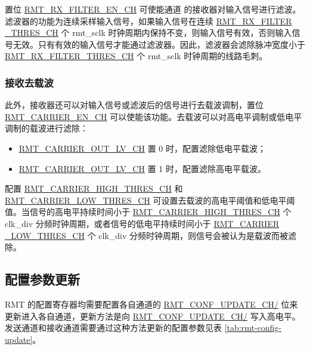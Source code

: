 \documentclass[main\_\_CN.tex]{subfiles}
\begin{document}
置位 \hyperref[fielddesc:RMTRXFILTERENCHM]{RMT\_RX\_FILTER\_EN\_CH} 可使能通道  的接收器对输入信号进行滤波。滤波器的功能为连续采样输入信号，如果输入信号在连续 \hyperref[fielddesc:RMTRXFILTERTHRESCHM]{RMT\_RX\_FILTER \_THRES\_CH} 个 rmt\_sclk 时钟周期内保持不变，则输入信号有效，否则输入信号无效。只有有效的输入信号才能通过滤波器。因此，滤波器会滤除脉冲宽度小于 \hyperref[fielddesc:RMTRXFILTERTHRESCHM]{RMT\_RX\_FILTER\_THRES\_CH} 个 rmt\_sclk 时钟周期的线路毛刺。


\subsubsection{接收去载波}

此外，接收器还可以对输入信号或滤波后的信号进行去载波调制，置位 \hyperref[fielddesc:RMTCARRIERENCHM]{RMT\_CARRIER\_EN\_CH} 可以使能该功能。去载波可以对高电平调制或低电平调制的载波进行滤除：
\begin{itemize}
    \item \hyperref[fielddesc:RMTCARRIEROUTLVCHM]{RMT\_CARRIER\_OUT\_LV\_CH} 置 0 时，配置滤除低电平载波；
    \item \hyperref[fielddesc:RMTCARRIEROUTLVCHM]{RMT\_CARRIER\_OUT\_LV\_CH} 置 1 时，配置滤除高电平载波。
\end{itemize}

配置 \hyperref[fielddesc:RMTCARRIERHIGHTHRESCHM]{RMT\_CARRIER\_HIGH\_THRES\_CH} 和 \hyperref[fielddesc:RMTCARRIERLOWTHRESCHM]{RMT\_CARRIER\_LOW\_THRES\_CH} 可设置去载波的高电平阈值和低电平阈值。当信号的高电平持续时间小于 \hyperref[fielddesc:RMTCARRIERHIGHTHRESCHM]{RMT\_CARRIER\_HIGH\_THRES\_CH} 个 clk\_div 分频时钟周期，或者信号的低电平持续时间小于 \hyperref[fielddesc:RMTCARRIERLOWTHRESCHM]{RMT\_CARRIER \_LOW\_THRES\_CH} 个 clk\_div 分频时钟周期，则信号会被认为是载波而被滤除。

\subsection{配置参数更新}\label{conf_update}
RMT 的配置寄存器均需要配置各自通道的 \hyperref[fielddesc:RMTCONFUPDATECHN]{RMT\_CONF\_UPDATE\_CH/} 位来更新进入各自通道，更新方法是向 \hyperref[fielddesc:RMTCONFUPDATECHN]{RMT\_CONF\_UPDATE\_CH/} 写入高电平。发送通道和接收通道需要通过这种方法更新的配置参数见表 \ref{tab:rmt-config-update}。
\end{document}
